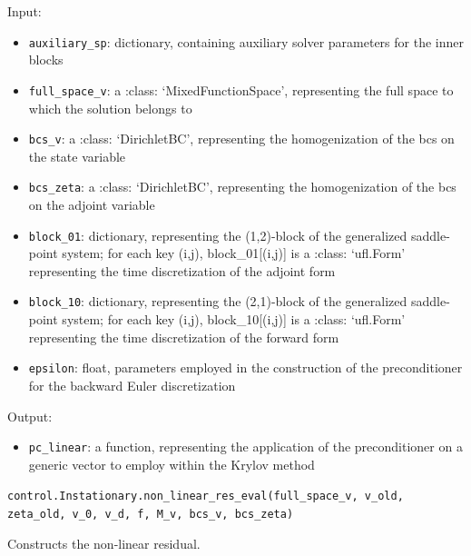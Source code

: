 \documentclass[letterpaper,10pt,english]{sphinxmanual}
\begin{document}
Input:
\begin{itemize}
\item \texttt{auxiliary{\_}sp}: dictionary, containing auxiliary solver parameters
            for the inner blocks

\item \texttt{full{\_}space{\_}v}: a :class: `MixedFunctionSpace', representing the
            full space to which the solution belongs to

\item \texttt{bcs{\_}v}: a :class: `DirichletBC', representing the homogenization
            of the bcs on the state variable

\item \texttt{bcs{\_}zeta}: a :class: `DirichletBC', representing the homogenization
            of the bcs on the adjoint variable

\item \texttt{block{\_}01}: dictionary, representing the (1,2)-block of the
            generalized saddle-point system; for each key (i,j),
            block\_01[(i,j)] is a :class: `ufl.Form' representing the time
            discretization of the adjoint form

\item \texttt{block{\_}10}: dictionary, representing the (2,1)-block of the
            generalized saddle-point system; for each key (i,j),
            block\_10[(i,j)] is a :class: `ufl.Form' representing the time
            discretization of the forward form

\item \texttt{epsilon}: float, parameters employed in the construction of the
            preconditioner for the backward Euler discretization
\end{itemize}

Output:
\begin{itemize}
\item \texttt{pc{\_}linear}: a function, representing the application of the
            preconditioner on a generic vector to employ within the Krylov
            method
\end{itemize}

\vspace{3ex}

\texttt{control.Instationary.non{\_}linear{\_}res{\_}eval(full{\_}space{\_}v, v{\_}old, zeta{\_}old, v{\_}0, v{\_}d, f, M{\_}v, bcs{\_}v, bcs{\_}zeta)}

Constructs the non-linear residual.
\end{document}
